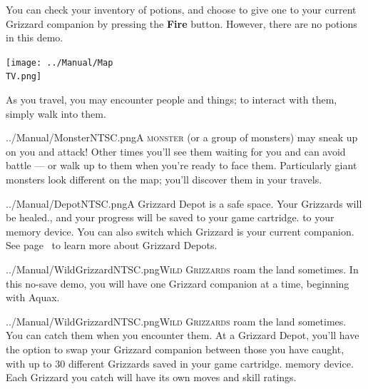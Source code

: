 \documentclass[10pt,twocolumn,openany,article]{memoir}
\newcommand\TV{NTSC}
\newcommand\TV{PAL}
\newcommand\TV{SECAM}
\begin{document}
You can check your inventory of potions,  and choose to give one to your
current  Grizzard  companion  by   pressing  the  \textbf{Fire}  button.
\ifdefined\DEMO However, there are no potions in this demo. \fi

\begin{center}
  \texttt{[image: ../Manual/Map\\TV.png]}
\end{center}

As you  travel, you may  encounter people  and things; to  interact with
them, simply walk into them.

\lettrine[image=true,                lines=5,               findent=3pt,
nindent=3pt]{../Manual/Monster\TV.png}{A   monster}  (or   a  group   of
monsters) may  sneak up on you  and attack! Other times  you'll see them
waiting for you and can avoid battle  --- or walk up to them when you're
ready to  face them. Particularly  giant monsters look different  on the
map; you'll discover them in your travels.

\lettrine[image=true,                lines=5,               findent=3pt,
nindent=3pt]{../Manual/Depot\TV.png}{A} Grizzard Depot  is a safe space.
Your  Grizzards will  be  healed\ifdefined\NOSAVE{}.{}\else{}, and  your
progress will  be saved \ifdefined\ATARIAGESAVE to  your game cartridge.
\else to your  memory device. \fi You can also  switch which Grizzard is
your  current  companion.  \fi See  page~\pageref{sec:GrizzardDepot}  to
learn more about Grizzard Depots.

\ifdefined\NOSAVE

\lettrine[image=true,                lines=5,               findent=3pt,
nindent=3pt]{../Manual/WildGrizzard\TV.png}{Wild  Grizzards}   roam  the
land sometimes. In this no-save demo, you will have one Grizzard companion at a time,
beginning with  Aquax.

\else

\lettrine[image=true,                lines=5,               findent=3pt,
nindent=3pt]{../Manual/WildGrizzard\TV.png}{Wild  Grizzards}   roam  the
land  sometimes.   You  can   catch  them   when  you   encounter  them.
At  a Grizzard  Depot,  you'll have  the option  to  swap your  Grizzard
companion  between  those you  have  caught,  with  up to  30  different
Grizzards saved  in your  \ifdefined\ATARIAGESAVE game  cartridge. \else
memory device. \fi Each Grizzard you catch will have its own moves and
skill ratings. 

\fi
\end{document}
